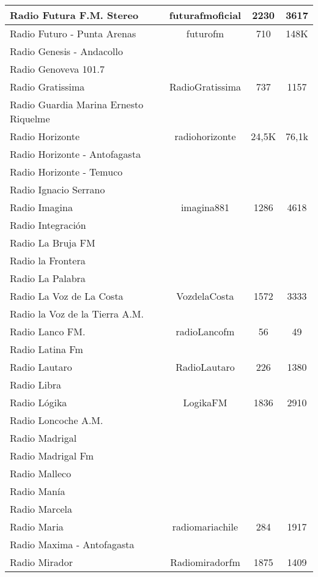 \begin{center}
\begin{longtable}{| l | c | c | c |}
Radio Futura F.M. Stereo	&	futurafmoficial	&	2230	&	3617	\\ \hline
Radio Futuro - Punta Arenas	&	futurofm	&	710	&	148K	\\ \hline
Radio Genesis - Andacollo	&		&		&		\\ \hline
Radio Genoveva 101.7	&		&		&		\\ \hline
Radio Gratissima	&	RadioGratissima	&	737	&	1157	\\ \hline
Radio Guardia Marina Ernesto Riquelme	&		&		&		\\ \hline
Radio Horizonte	&	radiohorizonte	&	24,5K	&	76,1k	\\ \hline
Radio Horizonte - Antofagasta	&		&		&		\\ \hline
Radio Horizonte - Temuco	&		&		&		\\ \hline
Radio Ignacio Serrano	&		&		&		\\ \hline
Radio Imagina	&	imagina881	&	1286	&	4618	\\ \hline
Radio Integración	&		&		&		\\ \hline
Radio La Bruja FM	&		&		&		\\ \hline
Radio la Frontera	&		&		&		\\ \hline
Radio La Palabra	&		&		&		\\ \hline
Radio La Voz de La Costa	&	VozdelaCosta	&	1572	&	3333	\\ \hline
Radio la Voz de la Tierra A.M.	&		&		&		\\ \hline
Radio Lanco FM.	&	radioLancofm	&	56	&	49	\\ \hline
Radio Latina Fm	&		&		&		\\ \hline
Radio Lautaro	&	RadioLautaro	&	226	&	1380	\\ \hline
Radio Libra	&		&		&		\\ \hline
Radio Lógika	&	LogikaFM	&	1836	&	2910	\\ \hline
Radio Loncoche A.M.	&		&		&		\\ \hline
Radio Madrigal	&		&		&		\\ \hline
Radio Madrigal Fm	&		&		&		\\ \hline
Radio Malleco	&		&		&		\\ \hline
Radio Manía	&		&		&		\\ \hline
Radio Marcela	&		&		&		\\ \hline
Radio Maria	&	radiomariachile	&	284	&	1917	\\ \hline
Radio Maxima - Antofagasta	&		&		&		\\ \hline
Radio Mirador	&	Radiomiradorfm	&	1875	&	1409	\\ \hline

\end{longtable}
\end{center}

